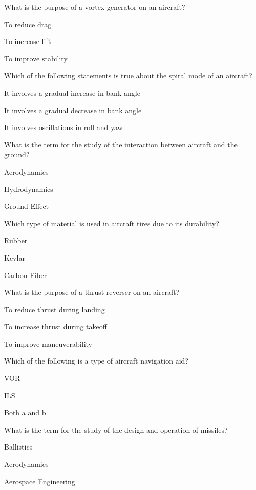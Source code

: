 \begin{enhancedmcq}{What is the purpose of a vortex generator on an aircraft?}
\item To reduce drag
\item To increase lift
\item To improve stability

\end{enhancedmcq}
\begin{enhancedmcq}{Which of the following statements is true about the spiral mode of an aircraft?}
\item It involves a gradual increase in bank angle
\item It involves a gradual decrease in bank angle
\item It involves oscillations in roll and yaw

\end{enhancedmcq}
\begin{enhancedmcq}{What is the term for the study of the interaction between aircraft and the ground?}
\item Aerodynamics
\item Hydrodynamics
\item Ground Effect

\end{enhancedmcq}
\begin{enhancedmcq}{Which type of material is used in aircraft tires due to its durability?}
\item Rubber
\item Kevlar
\item Carbon Fiber

\end{enhancedmcq}
\begin{enhancedmcq}{What is the purpose of a thrust reverser on an aircraft?}
\item To reduce thrust during landing
\item To increase thrust during takeoff
\item To improve maneuverability

\end{enhancedmcq}
\begin{enhancedmcq}{Which of the following is a type of aircraft navigation aid?}
\item VOR
\item ILS
\item Both a and b

\end{enhancedmcq}
\begin{enhancedmcq}{What is the term for the study of the design and operation of missiles?}
\item Ballistics
\item Aerodynamics
\item Aerospace Engineering

\end{enhancedmcq}
